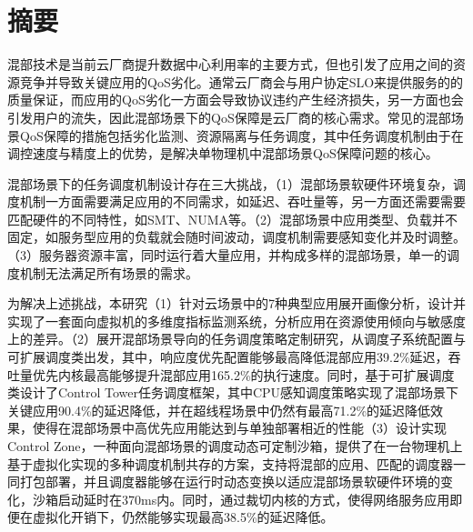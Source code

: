 
\maketitle%
\MAKETITLE%
\makedeclaration%
\intobmk\chapter*{摘\quad 要}%
\setcounter{page}{1}%


混部技术是当前云厂商提升数据中心利用率的主要方式，但也引发了应用之间的资源竞争并导致关键应用的QoS劣化。通常云厂商会与用户协定SLO来提供服务的的质量保证，而应用的QoS劣化一方面会导致协议违约产生经济损失，另一方面也会引发用户的流失，因此混部场景下的QoS保障是云厂商的核心需求。常见的混部场景QoS保障的措施包括劣化监测、资源隔离与任务调度，其中任务调度机制由于在调控速度与精度上的优势，是解决单物理机中混部场景QoS保障问题的核心。

混部场景下的任务调度机制设计存在三大挑战，（1）混部场景软硬件环境复杂，调度机制一方面需要满足应用的不同需求，如延迟、吞吐量等，另一方面还需要需要匹配硬件的不同特性，如SMT、NUMA等。（2）混部场景中应用类型、负载并不固定，如服务型应用的负载就会随时间波动，调度机制需要感知变化并及时调整。（3）服务器资源丰富，同时运行着大量应用，并构成多样的混部场景，单一的调度机制无法满足所有场景的需求。

为解决上述挑战，本研究（1）针对云场景中的7种典型应用展开画像分析，设计并实现了一套面向虚拟机的多维度指标监测系统，分析应用在资源使用倾向与敏感度上的差异。（2）展开混部场景导向的任务调度策略定制研究，从调度子系统配置与可扩展调度类出发，其中，响应度优先配置能够最高降低混部应用39.2\%延迟，吞吐量优先内核最高能够提升混部应用165.2\%的执行速度。同时，基于可扩展调度类设计了Control Tower任务调度框架，其中CPU感知调度策略实现了混部场景下关键应用90.4\%的延迟降低，并在超线程场景中仍然有最高71.2\%的延迟降低效果，使得在混部场景中高优先应用能达到与单独部署相近的性能（3）设计实现Control Zone，一种面向混部场景的调度动态可定制沙箱，提供了在一台物理机上基于虚拟化实现的多种调度机制共存的方案，支持将混部的应用、匹配的调度器一同打包部署，并且调度器能够在运行时动态变换以适应混部场景软硬件环境的变化，沙箱启动延时在370ms内。同时，通过裁切内核的方式，使得网络服务应用即便在虚拟化开销下，仍然能够实现最高38.5\%的延迟降低。


